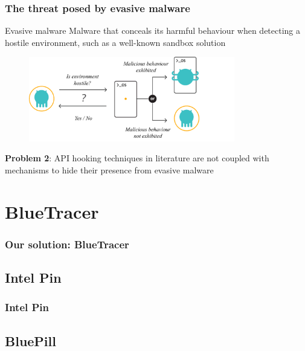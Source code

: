 \documentclass[compress]{beamer}
\begin{document}
\begin{frame}
    \frametitle{The threat posed by evasive malware}
	
		    \begin{beamerboxesrounded}[shadow=true]{Evasive malware}
Malware that conceals its harmful behaviour when detecting a
hostile environment, such as a well-known sandbox
solution
    \end{beamerboxesrounded}
    \bigskip
    
    \begin{figure}
    	\vspace{-0.2cm}
    	\hspace*{1cm}
        \includegraphics[width=9cm]{image/evasive.pdf}
    \end{figure}
    
    \textbf{Problem 2}: API hooking techniques in literature are not coupled with mechanisms to hide their presence from evasive malware


\end{frame}

\section{BlueTracer}

\begin{frame}
    \frametitle{Our solution: BlueTracer}
	

\end{frame}

\subsection{Intel Pin}

\begin{frame}
    \frametitle{Intel Pin}
	

\end{frame}

\subsection{BluePill}
\end{document}
